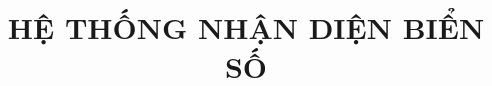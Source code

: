 \documentclass[final]{mobilereport}
\title{HỆ THỐNG NHẬN DIỆN BIỂN SỐ}
\begin{document}
\coverpage%

\frontmatter
\tableofcontents
\clearpage

\mainthesis









\end{document}
